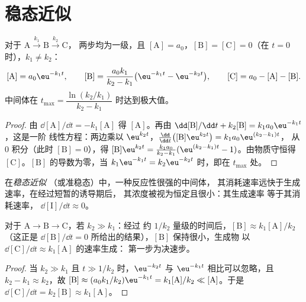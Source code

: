 \section{稳态近似}

\begin{theorem}[连续一级反应]\label{thm:b1:elementary-steps:consecutive}
对于 $\mathrm{A} \xrightarrow{k_1} \mathrm{B} \xrightarrow{k_2} \mathrm{C}$，
两步均为一级，且 $[\mathrm{A}] = a_0$，$[\mathrm{B}] =
[\mathrm{C}] = 0$（在 $t = 0$ 时），$k_1 \ne k_2$：
\[
  [\mathrm{A}] = a_0\eu^{-k_1t}, \qquad
  [\mathrm{B}] = \frac{a_0k_1}{k_2 - k_1}\big(\eu^{-k_1t} - \eu^{-k_2t}\big),
  \qquad [\mathrm{C}] = a_0 - [\mathrm{A}] - [\mathrm{B}] .
\]
中间体在 $t_{\max} = \dfrac{\ln(k_2/k_1)}
{k_2 - k_1}$ 时达到极大值。
\end{theorem}

\begin{proof}
由 $\dd[\mathrm{A}]/\dd t = -k_1[\mathrm{A}]$ 得 $[\mathrm{A}]$。再由
$\dd[\mathrm{B}]/\dd t + k_2[\mathrm{B}] = k_1a_0\eu^{-k_1t}$，这是一阶
线性方程：两边乘以 $\eu^{k_2t}$，$\frac{\dd}{\dd t}
\big([\mathrm{B}]\eu^{k_2t}\big) = k_1a_0\eu^{(k_2-k_1)t}$，
从 0 积分（此时 $[\mathrm{B}] = 0$），得 $[\mathrm{B}]\eu^{k_2t} =
\frac{k_1a_0}{k_2-k_1}(\eu^{(k_2-k_1)t} - 1)$。由物质守恒得
$[\mathrm{C}]$。$[\mathrm{B}]$ 的导数为零，当 $k_1\eu^{-k_1t}
= k_2\eu^{-k_2t}$ 时，即在 $t_{\max}$ 处。
\end{proof}

\begin{definition}[稳态近似]\label{def:b1:elementary-steps:qssa}
在\emph{稳态近似}
（或准稳态）中，一种反应性很强的中间体，
其消耗速率远快于生成速率，在经过短暂的诱导期后，
其浓度被视为恒定且很小：其生成速率
等于其消耗速率，
$\dd[\mathrm{I}]/\dd t \approx 0$。
\end{definition}

\begin{proposition}[稳态成立的条件]\label{prop:b1:elementary-steps:qssa-justified}
对于 $\mathrm{A} \to \mathrm{B} \to \mathrm{C}$，若 $k_2 \gg k_1$：经过
约 $1/k_2$ 量级的时间后，$[\mathrm{B}] \approx k_1[\mathrm{A}]/k_2$（这正是
$\dd[\mathrm{B}]/\dd t = 0$ 所给出的结果），$[\mathrm{B}]$ 保持很小，生成物
以 $\dd[\mathrm{C}]/\dd t \approx k_1[\mathrm{A}]$ 的速率生成：
第一步为决速步。
\end{proposition}

\begin{proof}
当 $k_2 \gg k_1$ 且 $t \gg 1/k_2$ 时，$\eu^{-k_2t}$ 与
$\eu^{-k_1t}$ 相比可以忽略，且 $k_2 - k_1 \approx k_2$，故 $[\mathrm{B}] \approx (a_0k_1/k_2)
\eu^{-k_1t} = k_1[\mathrm{A}]/k_2 \ll [\mathrm{A}]$。于是
$\dd[\mathrm{C}]/\dd t = k_2[\mathrm{B}] \approx k_1[\mathrm{A}]$。
\end{proof}

